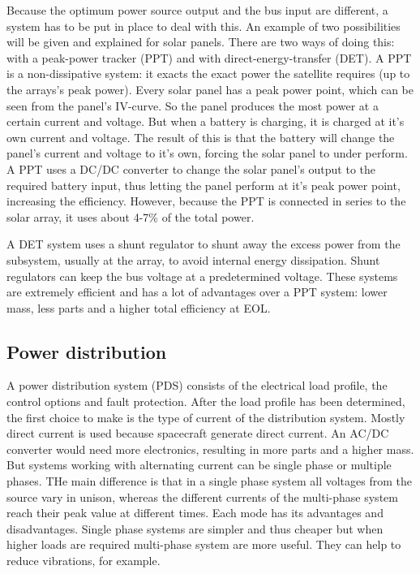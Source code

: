 Because the optimum power source output and the bus input are different, a system has to be put in place to deal with this. An example of two possibilities will be given and explained for solar panels.
There are two ways of doing this: with a peak-power tracker (PPT) and with direct-energy-transfer (DET). 
A PPT is a non-dissipative system: it exacts the exact power the satellite requires (up to the arrays's peak power). Every solar panel has a peak power point, which can be seen from the panel's IV-curve. So the panel produces the most power at a certain current and voltage. But when a battery is charging, it is charged at it's own current and voltage. The result of this is that the battery will change the panel's current and voltage to it's own, forcing the solar panel to under perform. A PPT uses a DC/DC converter to change the solar panel's output to the required battery input, thus letting the panel perform at it's peak power point, increasing the efficiency. However, because the PPT is connected in series to the solar array, it uses about 4-7\% of the total power.

A DET system uses a shunt regulator to shunt away the excess power from the subsystem, usually at the array, to avoid internal energy dissipation. Shunt regulators can keep the bus voltage at a predetermined voltage. These systems are extremely efficient and has a lot of advantages over a PPT system: lower mass, less parts and a higher total efficiency at EOL.

\subsection{Power distribution}
\label{blDOdistribution}

A power distribution system (PDS) consists of the electrical load profile, the control options and fault protection.
After the load profile has been determined, the first choice to make is the type of current of the distribution system. Mostly direct current is used because spacecraft generate direct current. An AC/DC converter would need more electronics, resulting in more parts and a higher mass. 
But systems working with alternating current can be single phase or multiple phases\cite{kuphaldt}. THe main difference is that in a single phase system all voltages from the source vary in unison, whereas the different currents of the multi-phase system reach their peak value at different times. Each mode has its advantages and disadvantages. Single phase systems are simpler and thus cheaper but when higher loads are required multi-phase system are more useful. They can help to reduce vibrations, for example.

